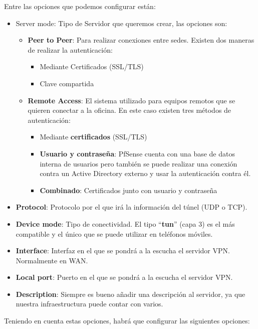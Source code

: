 Entre las opciones que podemos configurar están:

\begin{itemize}
    \item Server mode: Tipo de Servidor que queremos crear, las opciones son:
        \begin{itemize}
            \item \textbf{Peer to Peer}: Para realizar conexiones entre sedes. Existen dos maneras de realizar la autenticación:
            \begin{itemize}
                \item Mediante Certificados (SSL/TLS)
                \item Clave compartida
            \end{itemize}
            \item \textbf{Remote Access}: El sistema utilizado para equipos remotos que se quieren conectar a la oficina. En este caso existen tres métodos de autenticación:
            \begin{itemize}
                \item Mediante \textbf{certificados} (SSL/TLS)
                \item \textbf{Usuario y contraseña}: PfSense cuenta con una base de datos interna de usuarios pero también se puede realizar una conexión contra un Active Directory externo y usar la autenticación contra él.
                \item \textbf{Combinado}: Certificados junto con usuario y contraseña
            \end{itemize}
        \end{itemize}
    \item \textbf{Protocol}: Protocolo por el que irá la información del túnel (UDP o TCP).
    \item \textbf{Device mode}: Tipo de conectividad. El tipo “\textbf{tun}” (capa 3) es el más compatible y el único que se puede utilizar en teléfonos móviles.
    \item \textbf{Interface}: Interfaz en el que se pondrá a la escucha el servidor VPN. Normalmente en WAN.
    \item \textbf{Local port}: Puerto en el que se pondrá a la escucha el servidor VPN.
    \item \textbf{Description}: Siempre es bueno añadir una descripción al servidor, ya que nuestra infraestructura puede contar con varios.
\end{itemize}

Teniendo en cuenta estas opciones, habrá que configurar las siguientes opciones:

